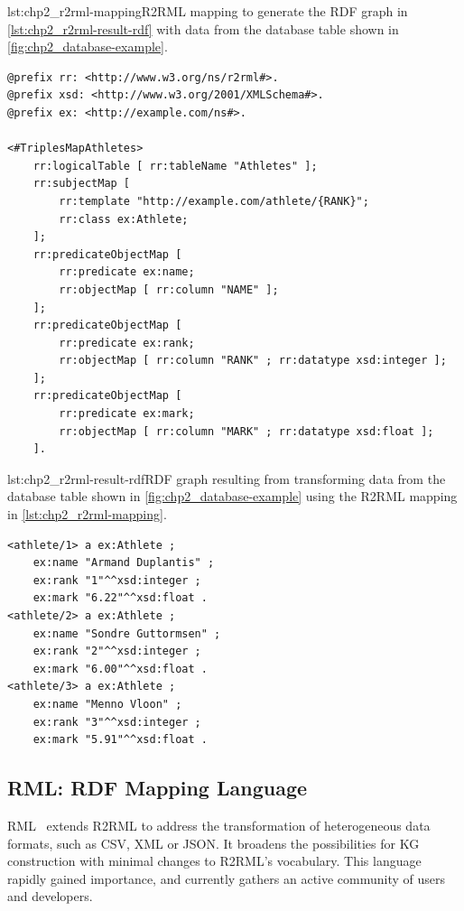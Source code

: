 \begin{captionedlisting}{lst:chp2_r2rml-mapping}{R2RML mapping to generate the RDF graph in \cref{lst:chp2_r2rml-result-rdf} with data from the database table shown in \cref{fig:chp2_database-example}.}
\centering
{\begin{lstlisting}[language=r2rml]
@prefix rr: <http://www.w3.org/ns/r2rml#>.
@prefix xsd: <http://www.w3.org/2001/XMLSchema#>.
@prefix ex: <http://example.com/ns#>.

<#TriplesMapAthletes>
    rr:logicalTable [ rr:tableName "Athletes" ];
    rr:subjectMap [
        rr:template "http://example.com/athlete/{RANK}";
        rr:class ex:Athlete;
    ];
    rr:predicateObjectMap [
        rr:predicate ex:name;
        rr:objectMap [ rr:column "NAME" ];
    ];
    rr:predicateObjectMap [
        rr:predicate ex:rank;
        rr:objectMap [ rr:column "RANK" ; rr:datatype xsd:integer ];
    ];
    rr:predicateObjectMap [
        rr:predicate ex:mark;
        rr:objectMap [ rr:column "MARK" ; rr:datatype xsd:float ];
    ].
\end{lstlisting}}
\end{captionedlisting}

\begin{minipage}{\textwidth}
\begin{captionedlisting}{lst:chp2_r2rml-result-rdf}{RDF graph resulting from transforming data from the database table shown in \cref{fig:chp2_database-example} using the R2RML mapping in \cref{lst:chp2_r2rml-mapping}.}
\centering\begin{lstlisting}[language=r2rml]
<athlete/1> a ex:Athlete ;
    ex:name "Armand Duplantis" ;
    ex:rank "1"^^xsd:integer ;
    ex:mark "6.22"^^xsd:float .
<athlete/2> a ex:Athlete ;
    ex:name "Sondre Guttormsen" ;
    ex:rank "2"^^xsd:integer ;
    ex:mark "6.00"^^xsd:float .
<athlete/3> a ex:Athlete ;
    ex:name "Menno Vloon" ;
    ex:rank "3"^^xsd:integer ;
    ex:mark "5.91"^^xsd:float .
\end{lstlisting}
\end{captionedlisting}
\end{minipage}



 
\subsection{RML: RDF Mapping Language}
\label{sec:chp2_RML}
RML~\parencite{Dimou2014rml} extends R2RML to address the transformation of heterogeneous data formats, such as CSV, XML or JSON. 
It broadens the possibilities for KG construction with minimal changes to R2RML's vocabulary.
This language rapidly gained importance, and currently gathers an active community of users and developers. 

